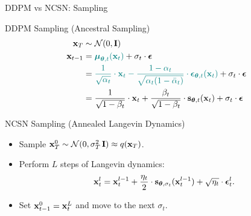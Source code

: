 \documentclass{beamer}
\renewcommand{\eqpause}{}
\renewcommand{\nextonslide}[1]{#1}
\begin{document}
\begin{frame}{DDPM vs NCSN: Sampling}
	\begin{block}{DDPM Sampling (Ancestral Sampling)}
			\vspace{-0.7cm}
			\begin{align*}
				\bx_T &\sim \cN(0, \bI) \\
				\bx_{t - 1} &= {\color{teal}\bmu_{\btheta, t}(\bx_t)} + \sigma_t \cdot \bepsilon 
				\nextonslide{\\& ={\color{teal}\frac{1}{\sqrt{\alpha_t}} \cdot \bx_t - \frac{1 - \alpha_t}{\sqrt{\alpha_t (1 - \bar{\alpha}_t)}} \cdot \bepsilon_{\btheta, t}(\bx_t)} +  \sigma_t \cdot \bepsilon
				}
				\nextonslide{
				\\ & = \frac{1}{\sqrt{1 - \beta_t}} \cdot \bx_t + \frac{\beta_t}{\sqrt{1 - \beta_t}} \cdot \bs_{\btheta, t} (\bx_t) +  \sigma_t \cdot \bepsilon
				}
			\end{align*}
			\vspace{-0.5cm}
	\end{block}
	\eqpause
	\begin{block}{NCSN Sampling (Annealed Langevin Dynamics)}
		\begin{itemize}
			\item Sample $\mathbf{x}_T^0 \sim \mathcal{N}(0, \sigma_T^2\, \mathbf{I}) \approx q(\mathbf{x}_T)$.
			\item Perform $L$ steps of Langevin dynamics:
			\vspace{-0.2cm}
			\[
				\mathbf{x}_t^l = \mathbf{x}_t^{l-1} + \frac{\eta_t}{2} \cdot \mathbf{s}_{\boldsymbol{\theta}, \sigma_t}(\mathbf{x}_t^{l - 1}) + \sqrt{\eta_t} \cdot \boldsymbol{\epsilon}_t^l.
			\] 
			\vspace{-0.7cm}
			\item Set $\mathbf{x}_{t-1}^0 = \mathbf{x}_t^L$ and move to the next $\sigma_t$.
		\end{itemize}
	\end{block}
\end{frame}
\end{document}
